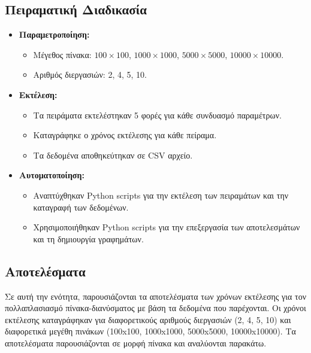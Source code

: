 \documentclass{article}
\begin{document}
\subsection*{Πειραματική Διαδικασία}
\begin{itemize}
    \item \textbf{Παραμετροποίηση:}
    \begin{itemize}
        \item Μέγεθος πίνακα: $100\times100$, $1000\times1000$, $5000\times5000$, $10000\times10000$.
        \item Αριθμός διεργασιών: 2, 4, 5, 10.
    \end{itemize}
    \item \textbf{Εκτέλεση:}
    \begin{itemize}
        \item Τα πειράματα εκτελέστηκαν 5 φορές για κάθε συνδυασμό παραμέτρων.
        \item Καταγράφηκε ο χρόνος εκτέλεσης για κάθε πείραμα.
        \item Τα δεδομένα αποθηκεύτηκαν σε CSV αρχείο.
    \end{itemize}
    \item \textbf{Αυτοματοποίηση:}
    \begin{itemize}
        \item Αναπτύχθηκαν Python scripts για την εκτέλεση των πειραμάτων και την καταγραφή των δεδομένων.
        \item Χρησιμοποιήθηκαν Python scripts για την επεξεργασία των αποτελεσμάτων και τη δημιουργία γραφημάτων.
    \end{itemize}
\end{itemize}
\subsection*{Αποτελέσματα}
Σε αυτή την ενότητα, παρουσιάζονται τα αποτελέσματα των χρόνων εκτέλεσης για τον πολλαπλασιασμό πίνακα-διανύσματος με βάση τα δεδομένα που παρέχονται. Οι χρόνοι εκτέλεσης καταγράφηκαν για διαφορετικούς αριθμούς διεργασιών (2, 4, 5, 10) και διαφορετικά μεγέθη πινάκων (100x100, 1000x1000, 5000x5000, 10000x10000). Τα αποτελέσματα παρουσιάζονται σε μορφή πίνακα και αναλύονται παρακάτω.
\end{document}
